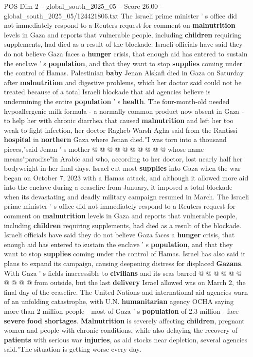 \begin{textsample}{POS Dim 2 – global\_south\_2025\_05 – Score 26.00 – global\_south\_2025\_05/124421806.txt}  \label{ex:f2_pos_048}
The Israeli prime minister ' s office did not immediately respond to a Reuters request for comment on \textbf{malnutrition} levels in Gaza and reports that vulnerable people, including \textbf{children} requiring supplements, had died as a result of the blockade.
Israeli officials have said they do not believe Gaza faces a \textbf{hunger} crisis, that enough aid has entered to sustain the enclave ' s \textbf{population}, and that they want to stop \textbf{supplies} coming under the control of Hamas.
Palestinian \textbf{baby} Jenan Alskafi died in Gaza on Saturday after \textbf{malnutrition} and digestive problems, which her doctor said could not be treated because of a total Israeli blockade that aid agencies believe is undermining the entire \textbf{population} ' s \textbf{health}.
The four-month-old needed hypoallergenic milk formula - a normally common product now absent in Gaza - to help her with chronic diarrhea that caused \textbf{malnutrition} and left her too weak to fight infection, her doctor Ragheb Warsh Agha said from the Rantissi \textbf{hospital} in \textbf{northern} Gaza where Jenan died."I was torn into a thousand pieces,"said Jenan ' s mother @ @ @ @ @ @ @ @ @ @ whose name means"paradise"in Arabic and who, according to her doctor, lost nearly half her bodyweight in her final days.
Israel cut most \textbf{supplies} into Gaza when the war began on October 7, 2023 with a Hamas attack, and although it allowed more aid into the enclave during a ceasefire from January, it imposed a total blockade when its devastating and deadly military campaign resumed in March.
The Israeli prime minister ' s office did not immediately respond to a Reuters request for comment on \textbf{malnutrition} levels in Gaza and reports that vulnerable people, including \textbf{children} requiring supplements, had died as a result of the blockade.
Israeli officials have said they do not believe Gaza faces a \textbf{hunger} crisis, that enough aid has entered to sustain the enclave ' s \textbf{population}, and that they want to stop \textbf{supplies} coming under the control of Hamas.
Israel has also said it plans to expand its campaign, causing deepening distress for displaced \textbf{Gazans}.
With Gaza ' s fields inaccessible to \textbf{civilians} and its seas barred @ @ @ @ @ @ @ @ @ @ from outside, but the last \textbf{delivery} Israel allowed was on March 2, the final day of the ceasefire.
The United Nations and international aid agencies warn of an unfolding catastrophe, with U.N. \textbf{humanitarian} agency OCHA saying more than 2 million people - most of Gaza ' s \textbf{population} of 2.3 million - face \textbf{severe} \textbf{food} \textbf{shortages}. \textbf{Malnutrition} is severely affecting \textbf{children}, pregnant women and people with chronic conditions, while also delaying the recovery of \textbf{patients} with serious war \textbf{injuries}, as aid stocks near depletion, several agencies said."The situation is getting worse every day.

\end{textsample}
